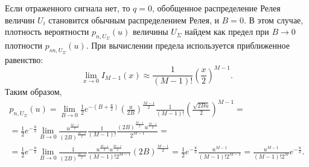\documentclass[a4paper,12pt]{article}
\begin{document}
    Если отраженного сигнала нет, то $q = 0$, обобщенное распределение Релея величин $U_i$ становится обычным распределением Релея, и $B = 0$. В этом случае, плотность
    вероятности $p_{n,U_\Sigma}(u)$ величины $U_\Sigma$ найдем как предел при $B \rightarrow 0$ плотности $p_{sn,U_\Sigma}(u)$. При вычислении предела используется
    приближенное равенство:
    \[
        \lim_{x \rightarrow 0} I_{M-1}(x) \approx \frac{1}{(M-1)!} \left ( \frac{x}{2} \right )^{M-1} .
    \]
    Таким образом,
    \begin{multline*}
        p_{n,U_\Sigma}(u)
        = \lim_{B \rightarrow 0} \frac{1}{2} e^{- \left ( B + \frac{u}{2} \right )} \left ( \frac{u}{2 B} \right )^\frac{M-1}{2} \frac{1}{(M-1)!} \left ( \frac{\sqrt{2 B u}}{2} \right )^{M-1} = \\
        = \frac{1}{2} e^{- \frac{u}{2}} \lim_{B \rightarrow 0} \frac{u^\frac{M-1}{2}}{\left ( 2 B \right )^\frac{M-1}{2}} \frac{1}{(M-1)!} \frac{\left ( 2 B \right )^\frac{M-1}{2} u^\frac{M-1}{2}}{2^{M-1}} = \\
        = \frac{1}{2} e^{- \frac{u}{2}} \lim_{B \rightarrow 0} \frac{1}{\left ( 2 B \right )^\frac{M-1}{2}} \frac{u^\frac{M-1}{2} u^\frac{M-1}{2}}{(M-1)! 2^{M-1}} \left ( 2 B \right )^\frac{M-1}{2}
        = \frac{1}{2} e^{- \frac{u}{2}} \frac{u^{M-1}}{(M-1)! 2^{M-1}}
        = \frac{u^{M-1}}{(M-1)! 2^{M}} e^{- \frac{u}{2}} .
    \end{multline*}
\end{document}
